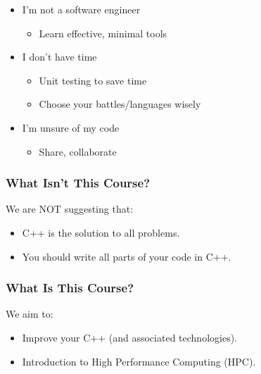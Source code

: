 \begin{itemize}
\itemsep1pt\parskip0pt
\item
  I'm not a software engineer

  \begin{itemize}
  \itemsep1pt\parskip0pt
  \item
    Learn effective, minimal tools
  \end{itemize}
\item
  I don't have time

  \begin{itemize}
  \itemsep1pt\parskip0pt
  \item
    Unit testing to save time
  \item
    Choose your battles/languages wisely
  \end{itemize}
\item
  I'm unsure of my code

  \begin{itemize}
  \itemsep1pt\parskip0pt
  \item
    Share, collaborate
  \end{itemize}
\end{itemize}

\subsubsection{What Isn't This Course?}\label{what-isnt-this-course}

We are NOT suggesting that:

\begin{itemize}
\itemsep1pt\parskip0pt
\item
  C++ is the solution to all problems.
\item
  You should write all parts of your code in C++.
\end{itemize}

\subsubsection{What Is This Course?}\label{what-is-this-course}

We aim to:

\begin{itemize}
\itemsep1pt\parskip0pt
\item
  Improve your C++ (and associated technologies).
\item
  Introduction to High Performance Computing (HPC).
\end{itemize}

